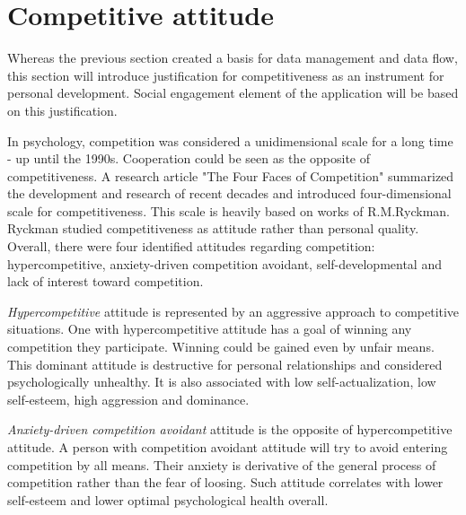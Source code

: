 
\section{Competitive attitude}\label{sec:competitive-attitude}



Whereas the previous section created a basis for data management and data flow,
this section will introduce justification for competitiveness as an instrument for personal development.
Social engagement element of the application will be based on this justification.

In psychology, competition was considered a unidimensional scale for a long time - up until the 1990s.
Cooperation could be seen as the opposite of competitiveness.
A research article "The Four Faces of Competition" summarized the development and research of recent decades
and introduced four-dimensional scale for competitiveness.\cite{the-four-faces-of-competetition}
This scale is heavily based on works of R.M.Ryckman.\cite{cit-ryckman-hca,cit-ryckman-adca,cit-ryckman-pdca}
Ryckman studied competitiveness as attitude rather than personal quality.
Overall, there were four identified attitudes regarding competition:
hypercompetitive, anxiety-driven competition avoidant, self-developmental and lack of interest toward competition.

\textit{Hypercompetitive} attitude is represented by an aggressive approach to competitive situations.
One with hypercompetitive attitude has a goal of winning any competition they participate.
Winning could be gained even by unfair means.
This dominant attitude is destructive for personal relationships and considered psychologically unhealthy.
It is also associated with low self-actualization, low self-esteem, high aggression and dominance.\cite{cit-ryckman-hca}

\textit{Anxiety-driven competition avoidant} attitude is the opposite of hypercompetitive attitude.
A person with competition avoidant attitude will try to avoid entering competition by all means.
Their anxiety is derivative of the general process of competition rather than the fear of loosing.
Such attitude correlates with lower self-esteem and lower optimal psychological health overall.\cite{cit-ryckman-adca}

